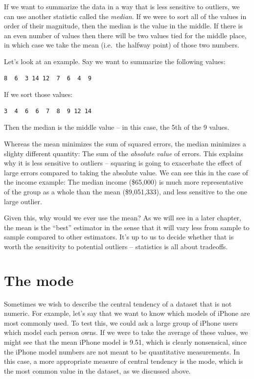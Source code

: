 \documentclass[12pt,]{book}
\theoremstyle{definition}
\theoremstyle{definition}
\theoremstyle{definition}
\theoremstyle{remark}
\begin{document}
If we want to summarize the data in a way that is less sensitive to outliers, we can use another statistic called the \emph{median}. If we were to sort all of the values in order of their magnitude, then the median is the value in the middle. If there is an even number of values then there will be two values tied for the middle place, in which case we take the mean (i.e.~the halfway point) of those two numbers.

Let's look at an example. Say we want to summarize the following values:

\begin{verbatim}
8  6  3 14 12  7  6  4  9
\end{verbatim}

If we sort those values:

\begin{verbatim}
3  4  6  6  7  8  9 12 14
\end{verbatim}

Then the median is the middle value -- in this case, the 5th of the 9 values.

Whereas the mean minimizes the sum of squared errors, the median minimizes a slighty different quantity: The sum of the \emph{absolute value} of errors. This explains why it is less sensitive to outliers -- squaring is going to exacerbate the effect of large errors compared to taking the absolute value. We can see this in the case of the income example: The median income (\$65,000) is much more representative of the group as a whole than the mean (\$9,051,333), and less sensitive to the one large outlier.

Given this, why would we ever use the mean? As we will see in a later chapter, the mean is the ``best'' estimator in the sense that it will vary less from sample to sample compared to other estimators. It's up to us to decide whether that is worth the sensitivity to potential outliers -- statistics is all about tradeoffs.

\hypertarget{the-mode}{%
\section{The mode}\label{the-mode}}

Sometimes we wish to describe the central tendency of a dataset that is not numeric. For example, let's say that we want to know which models of iPhone are most commonly used. To test this, we could ask a large group of iPhone users which model each person owns. If we were to take the average of these values, we might see that the mean iPhone model is 9.51, which is clearly nonsensical, since the iPhone model numbers are not meant to be quantitative measurements. In this case, a more appropriate measure of central tendency is the mode, which is the most common value in the dataset, as we discussed above.
\end{document}
